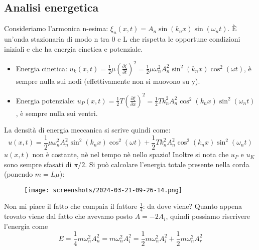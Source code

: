 \subsection{Analisi energetica}

Consideriamo l'armonica n-esima: \(\xi _n (x,t) = A_n \sin (k_n x) \sin (\omega _n t)\). È un'onda stazionaria di modo n tra 0 e L che rispetta le opportune condizioni iniziali e che ha energia cinetica e potenziale. 
\begin{itemize}
	\item Energia cinetica: \(u_k(x,t)= \frac{1}{2} \mu \left( \frac{\partial \xi }{\partial t}  \right)^{2} = \frac{1}{2} \mu \omega _n ^{2} A_n ^{2} \sin ^{2} (k_n x) \cos ^{2} (\omega t) \), è sempre nulla sui nodi (effettivamente non si muovono su y).
	\item Energia potenziale: \(u_P (x,t)= \frac{1}{2} T \left( \frac{\partial \xi }{\partial x}  \right)^{2} = \frac{1}{2}T k_n ^{2} A_n ^{2} \cos ^{2} (k_n x) \sin  ^{2} (\omega _n t) \), è sempre nulla sui ventri.
\end{itemize}
La densità di energia meccanica si scrive quindi come:
\[
	u(x,t) = \frac{1}{2} \mu \omega _n ^{2} A_n ^{2} \sin ^{2} (k_n x) \cos ^{2} (\omega t) + \frac{1}{2}T k_n ^{2} A_n ^{2} \cos ^{2} (k_n x) \sin  ^{2} (\omega _n t)
\]
\(u(x,t)\) non è costante, nè nel tempo nè nello spazio! Inoltre si nota che \(u_P\) e \(u_K\) sono sempre sfasati di \(\pi /2\). Si può calcolare l'energia totale presente nella corda (ponendo \(m =L \mu \)):
\begin{figure}[H]
	\centering
	\texttt{[image: screenshots/2024-03-21-09-26-14.png]}
\end{figure}
Non mi piace il fatto che compaia il fattore \(\frac{1}{4}\): da dove viene? Quanto appena trovato viene dal fatto che avevamo posto \(A = -2A_i\), quindi possiamo riscrivere l'energia come
\[
	E= \frac{1}{4} m \omega _n ^{2} A_n ^{2} = m \omega _n ^{2} A_i ^{2} = \frac{1}{2} m \omega _n ^{2} A_i ^{2} + \frac{1}{2} m \omega _n^{2} A_r ^{2}
\]
